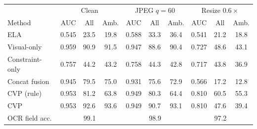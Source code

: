 \begin{tabular}{lccccccccc}
\toprule
 & \multicolumn{3}{c}{Clean} & \multicolumn{3}{c}{JPEG $q{=}60$} & \multicolumn{3}{c}{Resize $0.6\times$}\\
Method & AUC & All & Amb. & AUC & All & Amb. & AUC & All & Amb.\\
\midrule
ELA & 0.545 & 23.5 & 19.8 & 0.588 & 33.3 & 36.4 & 0.541 & 21.2 & 18.8\\
Visual-only & 0.959 & 90.9 & 91.5 & 0.947 & 88.6 & 90.4 & 0.727 & 48.6 & 43.1\\
Constraint-only & 0.757 & 44.2 & 43.2 & 0.758 & 44.3 & 42.8 & 0.717 & 43.8 & 36.9\\
Concat fusion & 0.945 & 79.5 & 75.0 & 0.931 & 75.6 & 72.9 & 0.566 & 17.2 & 12.8\\
CVP (rule) & 0.953 & 81.2 & 63.8 & 0.949 & 80.3 & 64.4 & 0.810 & 60.5 & 55.3\\
CVP & 0.953 & 92.6 & 93.6 & 0.949 & 90.7 & 93.1 & 0.810 & 47.6 & 39.4\\
\midrule
OCR field acc. & \multicolumn{3}{c}{99.1} & \multicolumn{3}{c}{98.9} & \multicolumn{3}{c}{97.2}\\
\bottomrule
\end{tabular}
